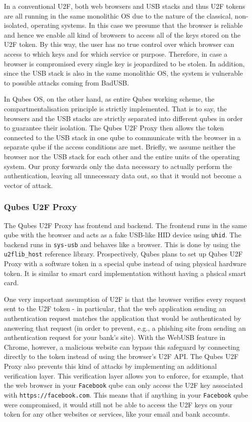 \documentclass[runningheads,a4paper]{article}
\begin{document}
In a conventional U2F, both web browsers and
USB stacks and thus U2F tokens are all running in the same monolithic
OS due to the nature of the classical, non-isolated, operating
systems. In this case we presume that the browser is reliable and
hence we enable all kind of browsers to access all of the keys stored
on the U2F token. By this way, the user has no true control over which
browser can access to which keys and for which service or
purpose. Therefore, in case a browser is compromised every single key
is jeopardized to be stolen. In addition, since the USB stack is also
in the same monolithic OS, the system is vulnerable to possible
attacks coming from BadUSB.

In Qubes OS, on the other hand, as entire Qubes working scheme, the
compartmentalisation principle is strictly implemented. That is to
say, the browsers and the USB stacks are strictly separated into
different qubes in order to guarantee their isolation.  The Qubes U2F
Proxy then allows the token connected to the USB stack in one qube to
communicate with the browser in a separate qube if the access
conditions are met. Briefly, we assume neither the browser nor the USB
stack for each other and the entire units of the operating system. Our
proxy forwards only the data necessary to actually perform the
authentication, leaving all unnecessary data out, so that it would not
become a vector of attack.

\subsubsection{Qubes U2F Proxy} 

The Qubes U2F Proxy has frontend and
backend. The frontend runs in the same qube with the browser and acts
as a fake USB-like HID device using \texttt{uhid}. The backend runs in
\texttt{sys-usb} and behaves like a browser. This is done by using the
\texttt{u2flib\_host} reference library. Prospectively, Qubes plans to
set up Qubes U2F Proxy with a software token in a special qube instead
of using physical hardware token. It is similar to smart card
implementation without having a phsical smart card.

One very important assumption of U2F is that the browser verifies
every request sent to the U2F token - in particular, that the web
application sending an authentication request matches the application
that would be authenticated by answering that request (in order to
prevent, e.g., a phishing site from sending an authentication request
for your bank's site). With the WebUSB feature in Chrome, however, a
malicious website can bypass this safeguard by connecting directly to
the token instead of using the browser's U2F API.  The Qubes U2F
Proxy also prevents this kind of attacks by implementing an additional
verification layer. This verification layer allows you to enforce, for
example, that the web browser in your \texttt{Facebook} qube can only
access the U2F key associated with \texttt{https://facebook.com}. This
means that if anything in your \texttt{Facebook} qube were
compromised, it would still not be able to access the U2F keys on your
token for any other websites or services, like your email and bank
accounts.
\end{document}
